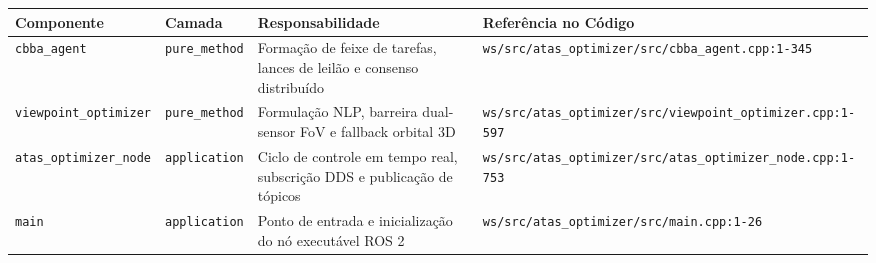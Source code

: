\documentclass[
  brazilian,
  a4paper]{article}
\newcounter{none} %
\begin{document}
{\def\LTcaptype{none} %
\begin{longtable}[]{@{}
  >{\raggedright\arraybackslash}p{}
  >{\raggedright\arraybackslash}p{}
  >{\raggedright\arraybackslash}p{}
  >{\raggedright\arraybackslash}p{}@{}}
\toprule\noalign{}
\begin{minipage}[b]{\linewidth}\raggedright
Componente
\end{minipage} & \begin{minipage}[b]{\linewidth}\raggedright
Camada
\end{minipage} & \begin{minipage}[b]{\linewidth}\raggedright
Responsabilidade
\end{minipage} & \begin{minipage}[b]{\linewidth}\raggedright
Referência no Código
\end{minipage} \\
\midrule\noalign{}
\endhead
\bottomrule\noalign{}
\endlastfoot
\texttt{cbba\_\allowbreak{}agent} & \texttt{pure\_\allowbreak{}method} & Formação de feixe de
tarefas, lances de leilão e consenso distribuído &
\texttt{ws/\allowbreak{}src/\allowbreak{}atas\_\allowbreak{}optimizer/\allowbreak{}src/\allowbreak{}cbba\_\allowbreak{}agent.\allowbreak{}cpp:\allowbreak{}1-345} \\
\texttt{viewpoint\_\allowbreak{}optimizer} & \texttt{pure\_\allowbreak{}method} & Formulação NLP,
barreira dual-sensor FoV e fallback orbital 3D &
\texttt{ws/\allowbreak{}src/\allowbreak{}atas\_\allowbreak{}optimizer/\allowbreak{}src/\allowbreak{}viewpoint\_\allowbreak{}optimizer.\allowbreak{}cpp:\allowbreak{}1-597} \\
\texttt{atas\_\allowbreak{}optimizer\_\allowbreak{}node} & \texttt{application} & Ciclo de
controle em tempo real, subscrição DDS e publicação de tópicos &
\texttt{ws/\allowbreak{}src/\allowbreak{}atas\_\allowbreak{}optimizer/\allowbreak{}src/\allowbreak{}atas\_\allowbreak{}optimizer\_\allowbreak{}node.\allowbreak{}cpp:\allowbreak{}1-753} \\
\texttt{main} & \texttt{application} & Ponto de entrada e inicialização
do nó executável ROS 2 &
\texttt{ws/\allowbreak{}src/\allowbreak{}atas\_\allowbreak{}optimizer/\allowbreak{}src/\allowbreak{}main.\allowbreak{}cpp:\allowbreak{}1-26} \\
\end{longtable}
}
\end{document}
